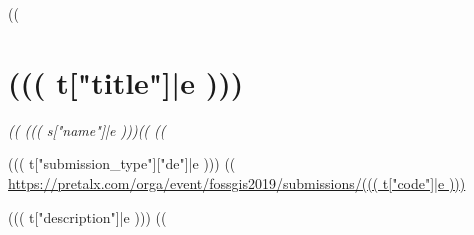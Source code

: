 \documentclass[a4paper]{scrartcl}
\begin{document}
\renewcommand{\arraystretch}{0}

\newlength\cardWidth
\setlength\cardWidth{13.3cm}
((%
  \section{((( t["title"]|e )))}
  
  \emph{%
    ((%
      ((( s["name"]|e )))((%
    ((%
  }
 
  \noindent ((( t["submission_type"]["de"]|e ))) ((%
      \url{https://pretalx.com/orga/event/fossgis2019/submissions/((( t["code"]|e )))}

  \vspace{1\baselineskip}

  \vspace{1\baselineskip}
  \noindent ((( t["description"]|e )))
((%
\end{document}
